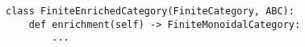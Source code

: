 \par\begin{minipage}{60ex}
\begin{verbatim}
class FiniteEnrichedCategory(FiniteCategory, ABC):
    def enrichment(self) -> FiniteMonoidalCategory:
        ...
\end{verbatim}
\end{minipage}\par